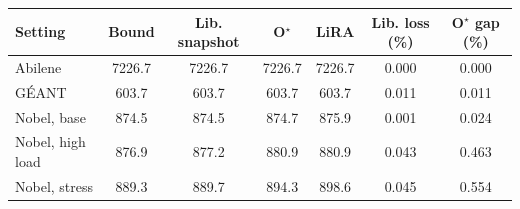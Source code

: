 \begin{tabular}{@{}lcccccc@{}}
\toprule
Setting & Bound & Lib. snapshot & O$^\star$ & LiRA & Lib. loss (\%) & O$^\star$ gap (\%) \\
\midrule
Abilene & 7226.7 & 7226.7 & 7226.7 & 7226.7 & 0.000 & 0.000 \\
G\'{E}ANT & 603.7 & 603.7 & 603.7 & 603.7 & 0.011 & 0.011 \\
Nobel, base & 874.5 & 874.5 & 874.7 & 875.9 & 0.001 & 0.024 \\
Nobel, high load & 876.9 & 877.2 & 880.9 & 880.9 & 0.043 & 0.463 \\
Nobel, stress & 889.3 & 889.7 & 894.3 & 898.6 & 0.045 & 0.554 \\
\bottomrule
\end{tabular}
